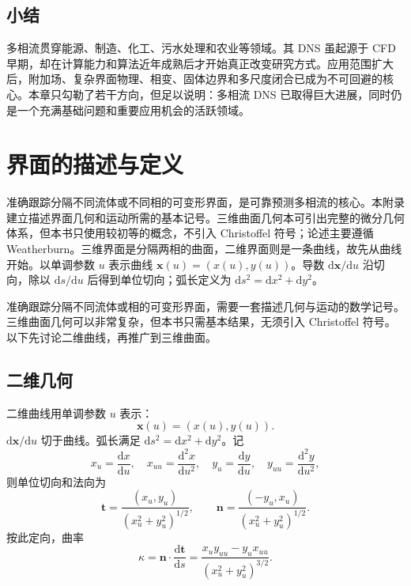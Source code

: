 \documentclass[11pt,a4paper,openany,fontset=none]{ctexbook}
\begin{document}
\section{小结}

多相流贯穿能源、制造、化工、污水处理和农业等领域。其 DNS 虽起源于 CFD 早期，却在计算能力和算法近年成熟后才开始真正改变研究方式。应用范围扩大后，附加场、复杂界面物理、相变、固体边界和多尺度闭合已成为不可回避的核心。本章只勾勒了若干方向，但足以说明：多相流 DNS 已取得巨大进展，同时仍是一个充满基础问题和重要应用机会的活跃领域。

\appendix
\chapter{界面的描述与定义}
准确跟踪分隔不同流体或不同相的可变形界面，是可靠预测多相流的核心。本附录建立描述界面几何和运动所需的基本记号。三维曲面几何本可引出完整的微分几何体系，但本书只使用较初等的概念，不引入 Christoffel 符号；论述主要遵循 Weatherburn。三维界面是分隔两相的曲面，二维界面则是一条曲线，故先从曲线开始。以单调参数 $u$ 表示曲线 $\bm x(u)=(x(u),y(u))$。导数 $\mathrm d\bm x/\mathrm du$ 沿切向，除以 $\mathrm ds/\mathrm du$ 后得到单位切向；弧长定义为 $\mathrm ds^2=\mathrm dx^2+\mathrm dy^2$。


准确跟踪分隔不同流体或相的可变形界面，需要一套描述几何与运动的数学记号。三维曲面几何可以非常复杂，但本书只需基本结果，无须引入 Christoffel 符号。以下先讨论二维曲线，再推广到三维曲面。

\section{二维几何}

二维曲线用单调参数 $u$ 表示：
\begin{equation}
 \bm x(u)=(x(u),y(u)). \tag{A.1}
\end{equation}
$\mathrm d\bm x/\mathrm du$ 切于曲线。弧长满足 $\mathrm ds^2=\mathrm dx^2+\mathrm dy^2$。记
\begin{equation*}
 x_u=\frac{\mathrm dx}{\mathrm du},\quad x_{uu}=\frac{\mathrm d^2x}{\mathrm du^2},\quad
 y_u=\frac{\mathrm dy}{\mathrm du},\quad y_{uu}=\frac{\mathrm d^2y}{\mathrm du^2},
\end{equation*}
则单位切向和法向为
\begin{equation}
 \bm t=\frac{(x_u,y_u)}{(x_u^2+y_u^2)^{1/2}},\qquad
 \bm n=\frac{(-y_u,x_u)}{(x_u^2+y_u^2)^{1/2}}. \tag{A.2}
\end{equation}
按此定向，曲率
\begin{equation}
 \kappa=\bm n\cdot\frac{\mathrm d\bm t}{\mathrm ds}
 =\frac{x_uy_{uu}-y_ux_{uu}}{(x_u^2+y_u^2)^{3/2}}. \tag{A.3}
\end{equation}
\end{document}

